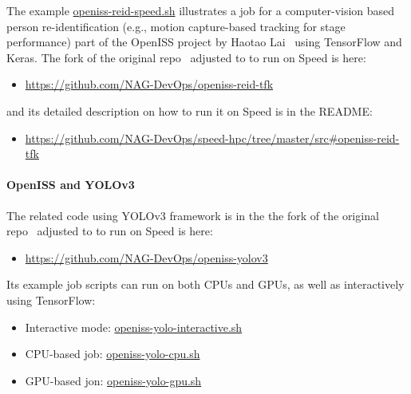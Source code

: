 The example
  \href{https://github.com/NAG-DevOps/speed-hpc/blob/master/src/openiss-reid-speed.sh}
  {openiss-reid-speed.sh}
illustrates a job for a computer-vision based person re-identification
(e.g., motion capture-based tracking for stage performance) part of the OpenISS
project by Haotao Lai~\cite{lai-haotao-mcthesis19} using TensorFlow and Keras.
The fork of the original repo~\cite{openiss-reid-tfk} adjusted to to run on Speed is here:

\begin{itemize}
	\item \url{https://github.com/NAG-DevOps/openiss-reid-tfk}
\end{itemize}

and its detailed description on how to run it on Speed is
in the README:

\begin{itemize}
	\item \url{https://github.com/NAG-DevOps/speed-hpc/tree/master/src#openiss-reid-tfk}
\end{itemize}

\paragraph{OpenISS and YOLOv3}
\label{sect:openiss-yolov3}

The related code using YOLOv3 framework is in the
the fork of the original repo~\cite{openiss-yolov3} adjusted
to to run on Speed is here:

\begin{itemize}
	\item \url{https://github.com/NAG-DevOps/openiss-yolov3}
\end{itemize}

Its example job scripts can run on both CPUs and GPUs,
as well as interactively using TensorFlow:

\begin{itemize}
	\item Interactive mode:
  \href{https://github.com/NAG-DevOps/speed-hpc/blob/master/src/openiss-yolo-interactive.sh}
  {openiss-yolo-interactive.sh}
	\item CPU-based job:
  \href{https://github.com/NAG-DevOps/speed-hpc/blob/master/src/openiss-yolo-cpu.sh}
  {openiss-yolo-cpu.sh}
	\item GPU-based jon:
  \href{https://github.com/NAG-DevOps/speed-hpc/blob/master/src/openiss-yolo-gpu.sh}
  {openiss-yolo-gpu.sh}
\end{itemize}


